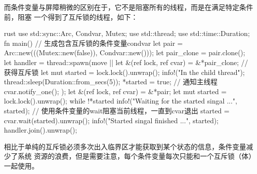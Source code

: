 而条件变量与屏障稍微的区别在于，它不是阻塞所有的线程，而是在满足特定条件前，阻塞
一个得到了互斥锁的线程，如下：
\begin{code-block}{rust}
use std::sync::{Arc, Condvar, Mutex};
use std::thread;
use std::time::Duration;
fn main() {
    // 生成包含互斥锁的条件变量condvar
    let pair = Arc::new(((Mutex::new(false)), Condvar::new()));
    let pair_clone = pair.clone();
    let handler = thread::spawn(move || {
        let &(ref lock, ref cvar) = &*pair_clone;
        // 获得互斥锁
        let mut started = lock.lock().unwrap();
        info!("In the child thread");
        thread::sleep(Duration::from_secs(5));
        *started = true;
        // 通知主线程
        cvar.notify_one();
    });
    let &(ref lock, ref cvar) = &*pair;
    let mut started = lock.lock().unwrap();
    while !*started {
        info!("Waiting for the started singal {} ...", started);
        // 使用条件变量的wait阻塞当前线程，一直到cvar退出
        started = cvar.wait(started).unwrap();
        info!("Started singal finished {} ...", started);
    }
    handler.join().unwrap();
}
\end{code-block}
相比于单纯的互斥锁必须多次出入临界区才能获取到某个状态的信息，条件变量减少了系统
资源的浪费，但是需要注意，每个条件变量每次只能和一个互斥锁（体）一起使用。

